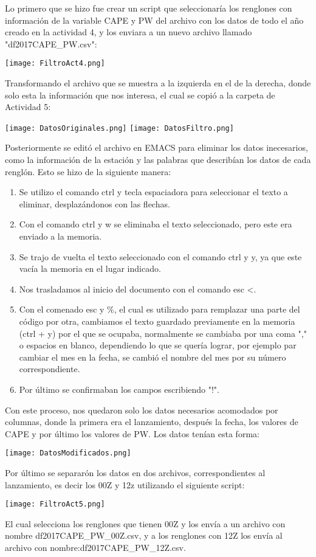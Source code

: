 \documentclass{article}
\begin{document}
Lo primero que se hizo fue crear un script que seleccionaría los renglones con información de la variable CAPE y PW del archivo con los datos de todo el año creado en la actividad 4, y los enviara a un nuevo archivo llamado "df2017CAPE\_PW.csv":
\begin{center}
    \texttt{[image: FiltroAct4.png]}
\end{center}
Transformando el archivo que se muestra a la izquierda en el de la derecha, donde solo esta la información que nos interesa, el cual se copió a la carpeta de Actividad 5:
\begin{center}
    \texttt{[image: DatosOriginales.png]}
     \texttt{[image: DatosFiltro.png]}
\end{center}
Posteriormente se editó el archivo en EMACS para eliminar los datos inecesarios, como la información de la estación y las palabras que describían los datos de cada renglón. Esto se hizo de la siguiente manera:
\begin{enumerate}
\item Se utilizo el comando ctrl y tecla espaciadora para seleccionar el texto a eliminar, desplazándonos con las flechas.
\item Con el comando ctrl y w se eliminaba el texto seleccionado, pero este era enviado a la memoria.
\item Se trajo de vuelta el texto seleccionado con el comando ctrl y y, ya que este vacía la memoria en el lugar indicado.
\item Nos trasladamos al inicio del documento con el comando esc <.
\item Con el comenado esc y \%, el cual es utilizado para remplazar una parte del código por otra, cambiamos el texto guardado previamente en la memoria (ctrl + y) por el que se ocupaba, normalmente se cambiaba por una coma "," o espacios en blanco, dependiendo lo que se quería lograr, por ejemplo par cambiar el mes en la fecha, se cambió el nombre del mes por su número correspondiente.
\item Por último se confirmaban los campos escribiendo "!".
\end{enumerate}
Con este proceso, nos quedaron solo los datos necesarios acomodados por columnas, donde la primera era el lanzamiento, después la fecha, los valores de CAPE y por último los valores de PW. Los datos tenían esta forma:
\begin{center}
    \texttt{[image: DatosModificados.png]}
\end{center}
Por último se separarón los datos en dos archivos, correspondientes al lanzamiento, es decir los 00Z y 12z utilizando el siguiente script:
\begin{center}
    \texttt{[image: FiltroAct5.png]}
\end{center}
El cual selecciona los renglones que tienen 00Z y los envía a un archivo con nombre df2017CAPE\_PW\_00Z.csv, y a los renglones con 12Z los envía al archivo con nombre:df2017CAPE\_PW\_12Z.csv.
\end{document}

